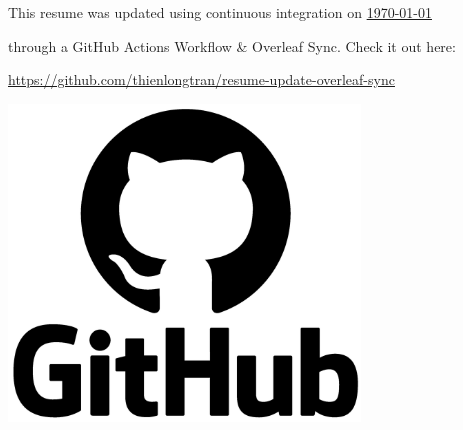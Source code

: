 \documentclass[letterpaper,11pt]{article}
\begin{document}
\vspace*{\fill}

\begin{minipage}{0.6\textwidth}
This resume was updated using continuous integration on \underline{\today}

through a GitHub Actions Workflow \& Overleaf Sync. Check it out here:

\href{https://github.com/thienlongtran/resume-update-overleaf-sync}{https://github.com/thienlongtran/resume-update-overleaf-sync}
\end{minipage}
\hfill%
\begin{minipage}{0.3\textwidth}\raggedleft
\includegraphics[width=0.7\textwidth]{./gha-logo.png}
\end{minipage}
\vspace*{\fill}
\end{document}
